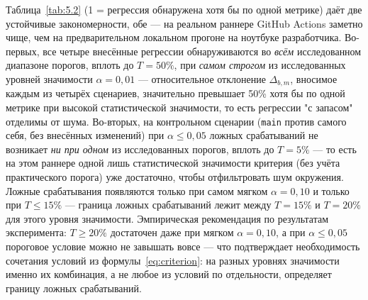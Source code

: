\documentclass[12pt,a4paper]{article}
\numberwithin{equation}{section}
\begin{document}
Таблица~\ref{tab:5.2} (1 = регрессия обнаружена хотя бы по одной метрике)
даёт две устойчивые закономерности, обе — на реальном раннере GitHub Actions
заметно чище, чем на предварительном локальном прогоне на ноутбуке
разработчика. Во-первых, все четыре внесённые регрессии обнаруживаются во
\emph{всём} исследованном диапазоне порогов, вплоть до $T=50\%$, при
\emph{самом строгом} из исследованных уровней значимости $\alpha=0{,}01$ —
относительное отклонение $\Delta_{b,m}$, вносимое каждым из четырёх
сценариев, значительно превышает 50\% хотя бы по одной метрике при высокой
статистической значимости, то есть регрессии "с запасом" отделимы от шума.
Во-вторых, на контрольном сценарии (\texttt{main} против самого себя, без
внесённых изменений) при $\alpha \le 0{,}05$ ложных срабатываний не
возникает \emph{ни при одном} из исследованных порогов, вплоть до
$T=5\%$ — то есть на этом раннере одной лишь статистической значимости
критерия (без учёта практического порога) уже достаточно, чтобы отфильтровать
шум окружения. Ложные срабатывания появляются только при самом мягком
$\alpha=0{,}10$ и только при $T \le 15\%$ — граница ложных срабатываний
лежит между $T=15\%$ и $T=20\%$ для этого уровня значимости. Эмпирическая
рекомендация по результатам эксперимента: $T \ge 20\%$ достаточен даже при
мягком $\alpha=0{,}10$, а при $\alpha \le 0{,}05$ пороговое условие можно не
завышать вовсе — что подтверждает необходимость сочетания условий из
формулы~\eqref{eq:criterion}: на разных уровнях значимости именно их
комбинация, а не любое из условий по отдельности, определяет границу
ложных срабатываний.
\end{document}
